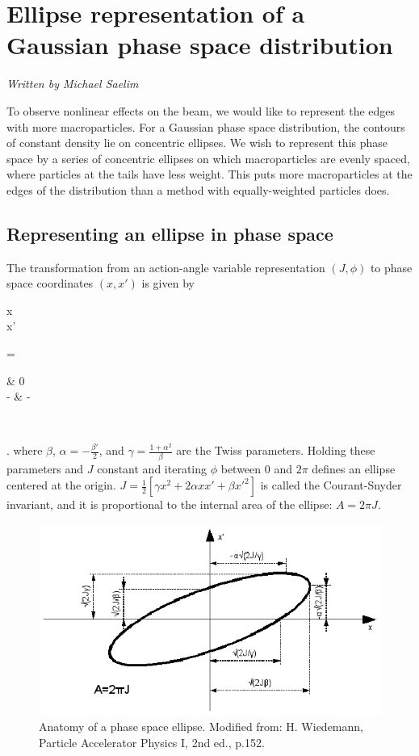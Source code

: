 \section{Ellipse representation of a Gaussian phase space distribution}

\textit{Written by Michael Saelim}

To observe nonlinear effects on the beam, we would like to represent the edges with more macroparticles.  For a Gaussian phase space distribution, the contours of constant density lie on concentric ellipses.  We wish to represent this phase space by a series of concentric ellipses on which macroparticles are evenly spaced, where particles at the tails have less weight.  This puts more macroparticles at the edges of the distribution than a method with equally-weighted particles does.

\subsection{Representing an ellipse in phase space}

The transformation from an action-angle variable representation $(J,\phi)$ to phase space coordinates $(x, x')$ is given by
\Begineq
	\begin{pmatrix} x \\ x' \end{pmatrix}
	=  
	\begin{pmatrix} \sqrt{\beta} & 0 \\ -\frac{\alpha}{\sqrt{\beta}} & - \end{pmatrix}
	\begin{pmatrix} \cos\phi \\ \sin\phi \end{pmatrix}.
\Endeq
where $\beta$, $\alpha = -\frac{\beta'}{2}$, and $\gamma = \frac{1+\alpha^2}{\beta}$ are the Twiss parameters.  Holding these parameters and $J$ constant and iterating $\phi$ between $0$ and $2\pi$ defines an ellipse centered at the origin.  $J = \frac{1}{2}[\gamma x^2 + 2 \alpha x x' + \beta x'^2]$ is called the Courant-Snyder invariant, and it is proportional to the internal area of the ellipse: $A = 2\pi J$. 

\begin{figure}[htp]
	\centering \includegraphics[scale=1.25]{phaseellipse.eps}
	\caption{Anatomy of a phase space ellipse.  Modified from: H. Wiedemann, Particle Accelerator Physics I, 2nd ed., p.152.}
	\label{fig:ellipse}
\end{figure}

